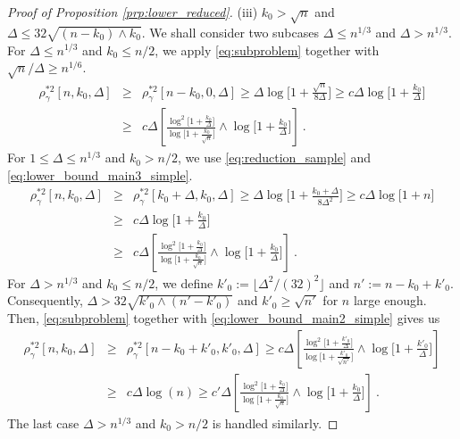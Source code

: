 \documentclass[twoside,11pt]{article}
\def\beqn{\begin{eqnarray*}}
\def\eeqn{\end{eqnarray*}}
\newcommand{\<}{\langle}
\renewcommand{\>}{\rangle}
\begin{document}
\begin{proof}[Proof of Proposition \ref{prp:lower_reduced}]
 \noindent
(iii) $k_0>\sqrt{n}$ and $\Delta\leq 32\sqrt{(n-k_0)\wedge  k_0}$. We shall consider two subcases $\Delta \leq n^{1/3}$ and $\Delta > n^{1/3}$. For $\Delta \leq n^{1/3}$ and $k_0\leq n/2$, we apply \eqref{eq:subproblem} together with $\sqrt{n}/\Delta\geq n^{1/6}$.
\beqn 
 \rho_{\gamma}^{*2}[n,k_0,\Delta]&\geq& \rho_{\gamma}^{*2}[n-k_0,0,\Delta]\geq \Delta \log\Big[1+ \frac{ \sqrt{n}}{8\Delta} \Big]\geq c\Delta \log\Big[1+ \frac{ k_0}{\Delta} \Big]\\ &\geq& c\Delta \left[\frac{\log^2\big[1+  \frac{k_0}{\Delta}\big]}{\log\big[1+ \frac{k_0}{\sqrt{n}}\big]}\wedge \log\big[1+ \frac{k_0}{\Delta}\big]\right]\ .
\eeqn 
For $1\leq \Delta \leq n^{1/3}$ and $k_0> n/2$, we use \eqref{eq:reduction_sample} and \eqref{eq:lower_bound_main3_simple}.
\beqn 
 \rho_{\gamma}^{*2}[n,k_0,\Delta]&\geq& \rho_{\gamma}^{*2}[k_0+\Delta,k_0,\Delta]\geq \Delta \log\Big[1  + \frac{k_0+\Delta}{8\Delta^2}\Big] \geq c \Delta \log\big[1+ n\big]\\
 &\geq& c\Delta \log\Big[1+ \frac{ k_0}{\Delta} \Big]\\ &\geq& c\Delta \left[\frac{\log^2\big[1+  \frac{k_0}{\Delta}\big]}{\log\big[1+ \frac{k_0}{\sqrt{n}}\big]}\wedge \log\big[1+ \frac{k_0}{\Delta}\big]\right]\ .
\eeqn 
For $\Delta > n^{1/3}$ and $k_0\leq n/2$, we  define $k'_0:= \lfloor \Delta^2/(32)^2\rfloor $ and $n':= n-k_0+k'_0$. Consequently, $\Delta > 32\sqrt{k'_0\wedge (n'-k'_0)}$ and $k'_0\geq \sqrt{n'}$   for $n$ large enough. Then, \eqref{eq:subproblem} together with \eqref{eq:lower_bound_main2_simple} gives us 
\beqn
 \rho_{\gamma}^{*2}[n,k_0,\Delta]&\geq & \rho_{\gamma}^{*2}[n-k_0+k'_0,k'_0,\Delta]\geq c\Delta \left[\frac{\log^2\big[1+  \frac{k'_0}{\Delta}\big]}{\log\big[1+ \frac{k'_0}{\sqrt{n'}}\big]}\wedge \log\big[1+ \frac{k'_0}{\Delta}\big]\right]\\
 &\geq &  c\Delta \log(n)\geq c'\Delta \left[\frac{\log^2\big[1+  \frac{k_0}{\Delta}\big]}{\log\big[1+ \frac{k_0}{\sqrt{n}}\big]}\wedge \log\big[1+ \frac{k_0}{\Delta}\big]\right]\ .
\eeqn
The last case $\Delta>n^{1/3}$ and $k_0>n/2$ is handled similarly.



\end{proof}
\end{document}
